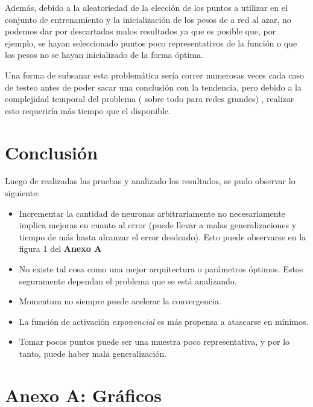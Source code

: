 \documentclass[%
    final,
    reprint,
    notitlepage,
    narroweqnarray,
    inline,
    twoside,
    invited
    ]{ieee}
\begin{document}
\par Además, debido a la aleatoriedad de la elección de los puntos a utilizar en el conjunto de entrenamiento y la inicialización de los pesos de a red al azar, no podemos dar por descartadas malos resultados ya que es posible que, por ejemplo, se hayan seleccionado puntos poco representativos de la función o que los pesos no se hayan inicializado de la forma óptima.
\par Una forma de subsanar esta problemática sería correr numerosas veces cada caso de testeo antes de poder sacar una conclusión con la tendencia, pero debido a la complejidad temporal del problema ( sobre 
todo para redes grandes) , realizar esto requeriría más tiempo que el disponible.

\section{Conclusión}

Luego de realizadas las pruebas y analizado los resultados, se pudo observar lo siguiente:\\
\begin{itemize}
\item Incrementar la cantidad de neuronas arbitrariamente no necesariamente 
implica mejoras en cuanto al error (puede llevar a malas generalizaciones y tiempo de más 
hasta alcanzar el error desdeado). Esto puede observarse en la figura 1 del \textbf{Anexo A}\\
\item No existe tal cosa como una mejor arquitectura o parámetros óptimos. Estos seguramente dependan 
el problema que se está analizando.\\
\item Momentum no siempre puede acelerar la convergencia.\\
\item La función de activación \textit{exponencial} es más propensa a atascarse en mínimos.
\item Tomar pocos puntos puede ser una muestra poco representativa, y por lo tanto, puede haber 
mala generalización.\\
\end{itemize}




\clearpage
\onecolumn

\section*{Anexo A: Gráficos}
\end{document}
